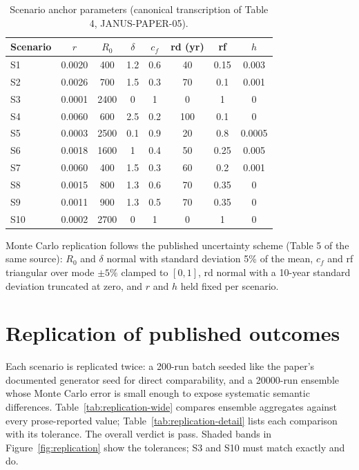 \documentclass[11pt]{article}
\newcommand{\pass}{\textcolor{green!55!black}{pass}}
\begin{document}
\begin{table}[ht]
\centering
\caption{Scenario anchor parameters (canonical transcription of Table 4,
JANUS-PAPER-05).}
\small
\begin{tabular}{lccccccc}
\toprule
Scenario & $r$ & $R_0$ & $\delta$ & $c_f$ & rd (yr) & rf & $h$ \\
\midrule
S1 & 0.0020 & 400 & 1.2 & 0.6 & 40 & 0.15 & 0.003 \\
S2 & 0.0026 & 700 & 1.5 & 0.3 & 70 & 0.1 & 0.001 \\
S3 & 0.0001 & 2400 & 0 & 1 & 0 & 1 & 0 \\
S4 & 0.0060 & 600 & 2.5 & 0.2 & 100 & 0.1 & 0 \\
S5 & 0.0003 & 2500 & 0.1 & 0.9 & 20 & 0.8 & 0.0005 \\
S6 & 0.0018 & 1600 & 1 & 0.4 & 50 & 0.25 & 0.005 \\
S7 & 0.0060 & 400 & 1.5 & 0.3 & 60 & 0.2 & 0.001 \\
S8 & 0.0015 & 800 & 1.3 & 0.6 & 70 & 0.35 & 0 \\
S9 & 0.0011 & 900 & 1.3 & 0.5 & 70 & 0.35 & 0 \\
S10 & 0.0002 & 2700 & 0 & 1 & 0 & 1 & 0 \\
\bottomrule
\end{tabular}
\end{table}

Monte Carlo replication follows the published uncertainty scheme (Table 5 of the same
source): $R_0$ and $\delta$ normal with standard deviation 5\% of the mean, $c_f$ and rf
triangular over mode $\pm 5\%$ clamped to $[0,1]$, rd normal with a 10-year standard
deviation truncated at zero, and $r$ and $h$ held fixed per scenario.

\section{Replication of published outcomes}
\label{sec:replication}

Each scenario is replicated twice: a 200-run batch seeded like the paper's documented
generator seed for direct comparability, and a
20000-run ensemble whose Monte Carlo error is small
enough to expose systematic semantic
differences. Table~\ref{tab:replication-wide} compares ensemble aggregates against
every prose-reported value; Table~\ref{tab:replication-detail} lists each comparison
with its tolerance. The overall verdict is \pass.
Shaded bands in Figure~\ref{fig:replication} show the tolerances; S3 and S10 must
match exactly and do.
\end{document}

